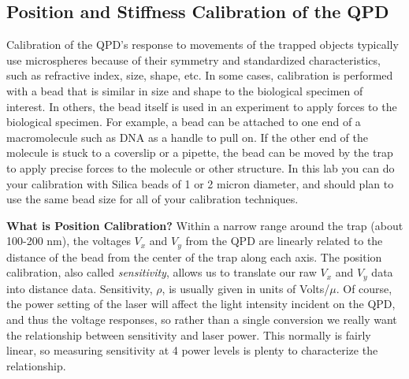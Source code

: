 \documentclass{../lab}
\begin{document}

\subsection{Position and Stiffness Calibration of the QPD}

Calibration of the QPD's response to movements of the trapped objects typically use microspheres because of their symmetry and standardized characteristics, such as refractive index, size, shape, etc. In some cases, calibration is performed with a bead that is similar in size and shape to the biological specimen of interest. In others, the bead itself is used in an experiment to apply forces to the biological specimen. For example, a bead can be attached to one end of a macromolecule such as DNA as a handle to pull on. If the other end of the molecule is stuck to a coverslip or a pipette, the bead can be moved by the trap to apply precise forces to the molecule or other structure. In this lab you can do your calibration with Silica beads of 1 or 2 micron diameter, and should plan to use the same bead size for all of your calibration techniques.

\textbf{What is Position Calibration?} Within a narrow range around the trap (about 100-200 nm), the voltages $V_x$ and $V_y$ from the QPD are linearly related \cite{Gittes} to the distance of the bead from the center of the trap along each axis. The position calibration, also called \emph{sensitivity}, allows us to translate our raw $V_x$ and $V_y$ data into distance data. Sensitivity, $\rho$, is usually given in units of Volts/$\mu$. Of course, the power setting of the laser will affect the light intensity incident on the QPD, and thus the voltage responses, so rather than a single conversion we really want the relationship between sensitivity and laser power. This normally is fairly linear, so measuring sensitivity at 4 power levels is plenty to characterize the relationship.
\end{document}
